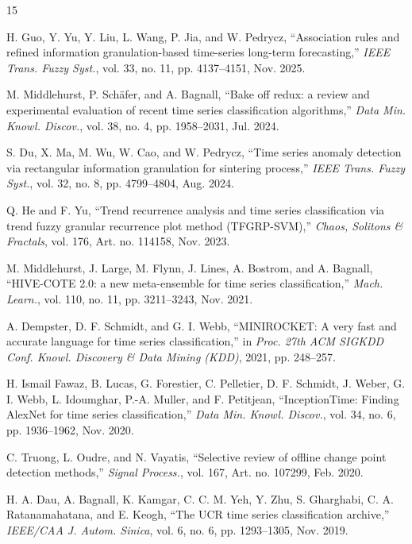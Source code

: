 \documentclass[conference]{IEEEtran}
\begin{document}
\begin{thebibliography}{15}

H. Guo, Y. Yu, Y. Liu, L. Wang, P. Jia, and W. Pedrycz, ``Association rules and refined information granulation-based time-series long-term forecasting,'' \textit{IEEE Trans. Fuzzy Syst.}, vol. 33, no. 11, pp. 4137--4151, Nov. 2025.

M. Middlehurst, P. Sch{\"a}fer, and A. Bagnall, ``Bake off redux: a review and experimental evaluation of recent time series classification algorithms,'' \textit{Data Min. Knowl. Discov.}, vol. 38, no. 4, pp. 1958--2031, Jul. 2024.

S. Du, X. Ma, M. Wu, W. Cao, and W. Pedrycz, ``Time series anomaly detection via rectangular information granulation for sintering process,'' \textit{IEEE Trans. Fuzzy Syst.}, vol. 32, no. 8, pp. 4799--4804, Aug. 2024.

Q. He and F. Yu, ``Trend recurrence analysis and time series classification via trend fuzzy granular recurrence plot method (TFGRP-SVM),'' \textit{Chaos, Solitons \& Fractals}, vol. 176, Art. no. 114158, Nov. 2023.

M. Middlehurst, J. Large, M. Flynn, J. Lines, A. Bostrom, and A. Bagnall, ``HIVE-COTE 2.0: a new meta-ensemble for time series classification,'' \textit{Mach. Learn.}, vol. 110, no. 11, pp. 3211--3243, Nov. 2021.

A. Dempster, D. F. Schmidt, and G. I. Webb, ``MINIROCKET: A very fast and accurate language for time series classification,'' in \textit{Proc. 27th ACM SIGKDD Conf. Knowl. Discovery \& Data Mining (KDD)}, 2021, pp. 248--257.

H. Ismail Fawaz, B. Lucas, G. Forestier, C. Pelletier, D. F. Schmidt, J. Weber, G. I. Webb, L. Idoumghar, P.-A. Muller, and F. Petitjean, ``InceptionTime: Finding AlexNet for time series classification,'' \textit{Data Min. Knowl. Discov.}, vol. 34, no. 6, pp. 1936--1962, Nov. 2020.

C. Truong, L. Oudre, and N. Vayatis, ``Selective review of offline change point detection methods,'' \textit{Signal Process.}, vol. 167, Art. no. 107299, Feb. 2020.

H. A. Dau, A. Bagnall, K. Kamgar, C. C. M. Yeh, Y. Zhu, S. Gharghabi, C. A. Ratanamahatana, and E. Keogh, ``The UCR time series classification archive,'' \textit{IEEE/CAA J. Autom. Sinica}, vol. 6, no. 6, pp. 1293--1305, Nov. 2019.


\end{thebibliography}
\end{document}
